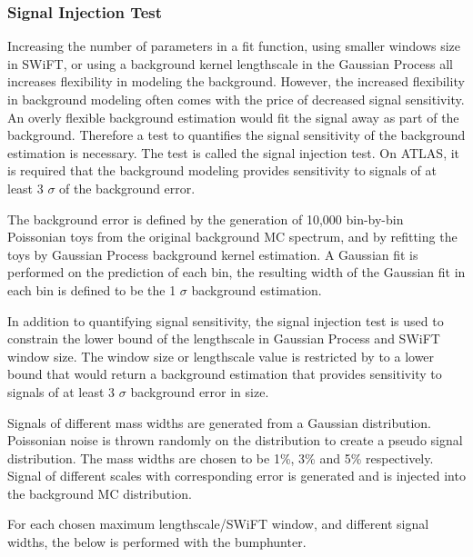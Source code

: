 \subsubsection{Signal Injection Test}
\label{sec:signalInjection}

    Increasing the number of parameters in a fit function, using smaller windows size in SWiFT, or using a background kernel lengthscale in the Gaussian Process all increases flexibility in modeling the background. However, the increased flexibility in background modeling often comes with the price of decreased signal sensitivity. An overly flexible background estimation would fit the signal away as part of the background. 
    Therefore a test to quantifies the signal sensitivity of the background estimation is necessary. The test is called the signal injection test. On ATLAS, it is required that the background modeling provides sensitivity to signals of at least 3 $\sigma$ of the background error.

    The background error is defined by the generation of 10,000 bin-by-bin Poissonian toys from the original background MC spectrum, and by refitting the toys by Gaussian Process background kernel estimation. A Gaussian fit is performed on the prediction of each bin, the resulting width of the Gaussian fit in each bin is defined to be the 1 $\sigma$ background estimation. 


    In addition to quantifying signal sensitivity, the signal injection test is used to constrain the lower bound of the lengthscale in Gaussian Process and SWiFT window size. The window size or lengthscale value is restricted by to a lower bound that would return a background estimation that provides sensitivity to signals of at least 3 $\sigma$ background error in size.

    Signals of different mass widths are generated from a Gaussian distribution. Poissonian noise is thrown randomly on the distribution to create a pseudo signal distribution. The mass widths are chosen to be 1\%, 3\% and 5\% respectively. Signal of different scales with corresponding error is generated and is injected into the background MC distribution.

    For each chosen maximum lengthscale/SWiFT window, and different signal widths, the below is performed with the bumphunter.


